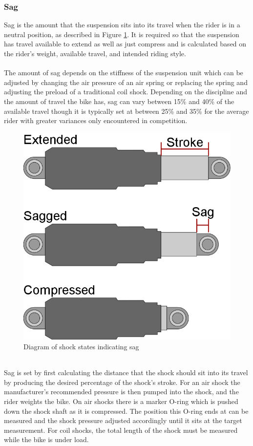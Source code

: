 	\subsubsection{Sag} \label{sec:sag}
		Sag is the amount that the suspension sits into its travel when the rider is in a neutral position, as described in Figure \ref{fig:sag}. It is required so that the suspension has travel available to extend as well as just compress and is calculated based on the rider’s weight, available travel, and intended riding style.
		\\\\
		The amount of sag depends on the stiffness of the suspension unit which can be adjusted by changing the air pressure of an air spring or replacing the spring and adjusting the preload of a traditional coil shock. Depending on the discipline and the	amount of travel the bike has, sag can vary between 15\% and 40\% of the available travel though it is typically set at between 25\% and 35\% for the average rider with greater variances only encountered in competition.
		\begin{figure}[h!]
			\centering
			\includegraphics[scale=0.5]{../images/sag_diagram.png}
			\caption{Diagram of shock states indicating sag}
			\label{fig:sag}
		\end{figure}
		\\
		Sag is set by first calculating the distance that the shock should sit into its travel by producing the desired percentage of the shock's stroke. For an air shock the manufacturer's recommended pressure is then pumped into the shock, and the rider weights the bike. On air shocks there is a marker O-ring which is pushed down the shock shaft as it is compressed. The position this O-ring ends at can be measured and the shock pressure adjusted accordingly until it sits at the target measurement. For coil shocks, the total length of the shock must be measured while the bike is under load. 
